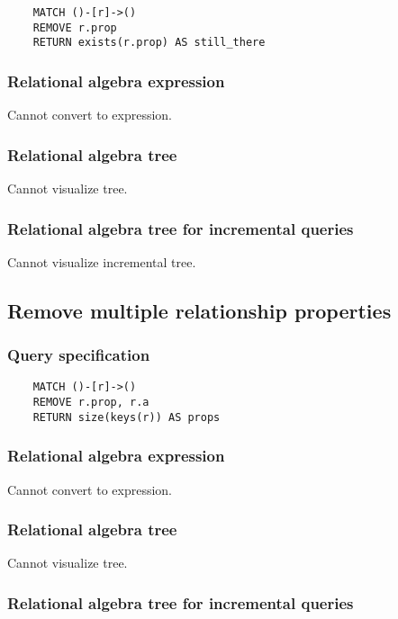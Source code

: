 	\begin{lstlisting}
	MATCH ()-[r]->()
	REMOVE r.prop
	RETURN exists(r.prop) AS still_there
	\end{lstlisting}


	\subsubsection*{Relational algebra expression}

	Cannot convert to expression.

	\subsubsection*{Relational algebra tree}

	Cannot visualize tree.

	\subsubsection*{Relational algebra tree for incremental queries}

	Cannot visualize incremental tree.
	\subsection{Remove multiple relationship properties}

	\subsubsection*{Query specification}

	\begin{lstlisting}
	MATCH ()-[r]->()
	REMOVE r.prop, r.a
	RETURN size(keys(r)) AS props
	\end{lstlisting}


	\subsubsection*{Relational algebra expression}

	Cannot convert to expression.

	\subsubsection*{Relational algebra tree}

	Cannot visualize tree.

	\subsubsection*{Relational algebra tree for incremental queries}

